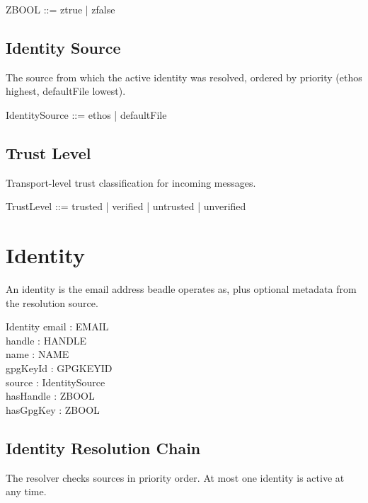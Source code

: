 \documentclass[a4paper,10pt,fleqn]{article}
\begin{document}
\begin{zed}
ZBOOL ::= ztrue | zfalse
\end{zed}

\subsection{Identity Source}

The source from which the active identity was resolved, ordered by
priority (ethos highest, defaultFile lowest).

\begin{zed}
IdentitySource ::= ethos | defaultFile
\end{zed}

\subsection{Trust Level}

Transport-level trust classification for incoming messages.

\begin{zed}
TrustLevel ::= trusted | verified | untrusted | unverified
\end{zed}

\section{Identity}

An identity is the email address beadle operates as, plus optional
metadata from the resolution source.

\begin{schema}{Identity}
email : EMAIL \\
handle : HANDLE \\
name : NAME \\
gpgKeyId : GPGKEYID \\
source : IdentitySource \\
hasHandle : ZBOOL \\
hasGpgKey : ZBOOL
\end{schema}

\subsection{Identity Resolution Chain}

The resolver checks sources in priority order. At most one identity
is active at any time.
\end{document}
